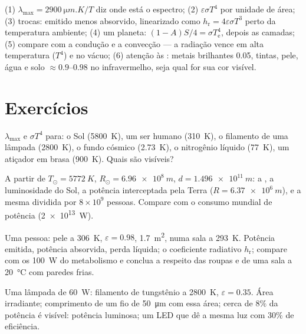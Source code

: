 \begin{method}\label{meth:b2:thermal-radiation:method}
(1) $\lambda_{\max} = \qty{2900}{\micro m.K}/T$ diz onde está o espectro;
(2) $\varepsilon\sigma T^4$ por unidade de área; (3) trocas: emitido
menos absorvido, linearizado como $h_{\text{r}} = 4\varepsilon\sigma T^3$ perto da
temperatura ambiente; (4) um planeta: $(1 - A)S/4 = \sigma T_{\text{e}}^4$, depois
as camadas; (5) compare com a condução e a convecção --- a radiação
vence em alta temperatura ($T^4$) e no vácuo; (6) atenção às :
metais brilhantes \qty{0.05}{}, tintas, pele, água e solo $\approx 0.9$--$0.98$
no infravermelho, seja qual for sua cor visível.
\end{method}

\section{Exercícios}

\begin{exercise}[$\star$]\label{exo:b2:thermal-radiation:1}
$\lambda_{\max}$ e $\sigma T^4$ para: o Sol (\qty{5800}{K}), um ser humano
(\qty{310}{K}), o filamento de uma lâmpada (\qty{2800}{K}), o fundo cósmico
(\qty{2.73}{K}), o nitrogênio líquido (\qty{77}{K}), um atiçador em brasa
(\qty{900}{K}). Quais são visíveis?
\end{exercise}

\begin{exercise}[$\star$]\label{exo:b2:thermal-radiation:2}
A partir de $T_\odot = \qty{5772}{K}$, $R_\odot = \qty{6.96e8}{m}$, $d = \qty{1.496e11}{m}$:
a , a luminosidade do Sol, a potência interceptada pela
Terra ($R = \qty{6.37e6}{m}$), e a mesma dividida por $8 \times 10^9$
pessoas. Compare com o consumo mundial de potência (\qty{2e13}{W}).
\end{exercise}

\begin{exercise}[$\star$]\label{exo:b2:thermal-radiation:3}
Uma pessoa: pele a \qty{306}{K}, $\varepsilon = 0.98$, \qty{1.7}{m^2}, numa
sala a \qty{293}{K}. Potência emitida, potência absorvida, perda líquida; o
coeficiente radiativo $h_{\text{r}}$; compare com os \qty{100}{W} do
metabolismo e conclua a respeito das roupas e de uma sala a \qty{20}{\celsius}
com paredes frias.
\end{exercise}

\begin{exercise}[$\star$]\label{exo:b2:thermal-radiation:4}
Uma lâmpada de \qty{60}{W}: filamento de tungstênio a \qty{2800}{K}, $\varepsilon = 0.35$.
Área irradiante; comprimento de um fio de \qty{50}{\micro m} com essa área;
cerca de $8\%$ da potência é visível: potência luminosa; um LED que dê a
mesma luz com $30\%$ de eficiência.
\end{exercise}

